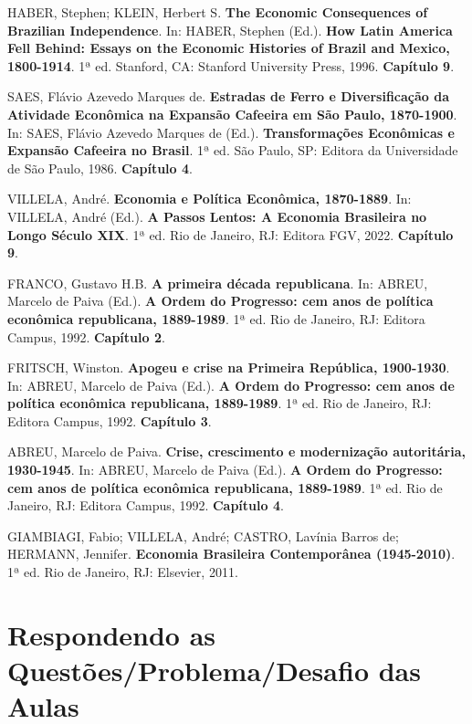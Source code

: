 \documentclass[a4paper,12pt]{article}[abntex2]
\begin{document}
\begin{thebibliography}{99}
HABER, Stephen; KLEIN, Herbert S. \textbf{The Economic Consequences of Brazilian Independence}. In: HABER, Stephen (Ed.). \textbf{How Latin America Fell Behind: Essays on the Economic Histories of Brazil and Mexico, 1800-1914}. 1ª ed. Stanford, CA: Stanford University Press, 1996. \textbf{Capítulo 9}.

SAES, Flávio Azevedo Marques de. \textbf{Estradas de Ferro e Diversificação da Atividade Econômica na Expansão Cafeeira em São Paulo, 1870-1900}. In: SAES, Flávio Azevedo Marques de (Ed.). \textbf{Transformações Econômicas e Expansão Cafeeira no Brasil}. 1ª ed. São Paulo, SP: Editora da Universidade de São Paulo, 1986. \textbf{Capítulo 4}.

VILLELA, André. \textbf{Economia e Política Econômica, 1870-1889}. In: VILLELA, André (Ed.). \textbf{A Passos Lentos: A Economia Brasileira no Longo Século XIX}. 1ª ed. Rio de Janeiro, RJ: Editora FGV, 2022. \textbf{Capítulo 9}.

FRANCO, Gustavo H.B. \textbf{A primeira década republicana}. In: ABREU, Marcelo de Paiva (Ed.). \textbf{A Ordem do Progresso: cem anos de política econômica republicana, 1889-1989}. 1ª ed. Rio de Janeiro, RJ: Editora Campus, 1992. \textbf{Capítulo 2}.

FRITSCH, Winston. \textbf{Apogeu e crise na Primeira República, 1900-1930}. In: ABREU, Marcelo de Paiva (Ed.). \textbf{A Ordem do Progresso: cem anos de política econômica republicana, 1889-1989}. 1ª ed. Rio de Janeiro, RJ: Editora Campus, 1992. \textbf{Capítulo 3}.

ABREU, Marcelo de Paiva. \textbf{Crise, crescimento e modernização autoritária, 1930-1945}. In: ABREU, Marcelo de Paiva (Ed.). \textbf{A Ordem do Progresso: cem anos de política econômica republicana, 1889-1989}. 1ª ed. Rio de Janeiro, RJ: Editora Campus, 1992. \textbf{Capítulo 4}.

GIAMBIAGI, Fabio; VILLELA, André; CASTRO, Lavínia Barros de; HERMANN, Jennifer. \textbf{Economia Brasileira Contemporânea (1945-2010)}. 1ª ed. Rio de Janeiro, RJ: Elsevier, 2011.


\end{thebibliography}

\newpage

\section{\textbf{Respondendo as Questões/Problema/Desafio das Aulas}}
\end{document}
